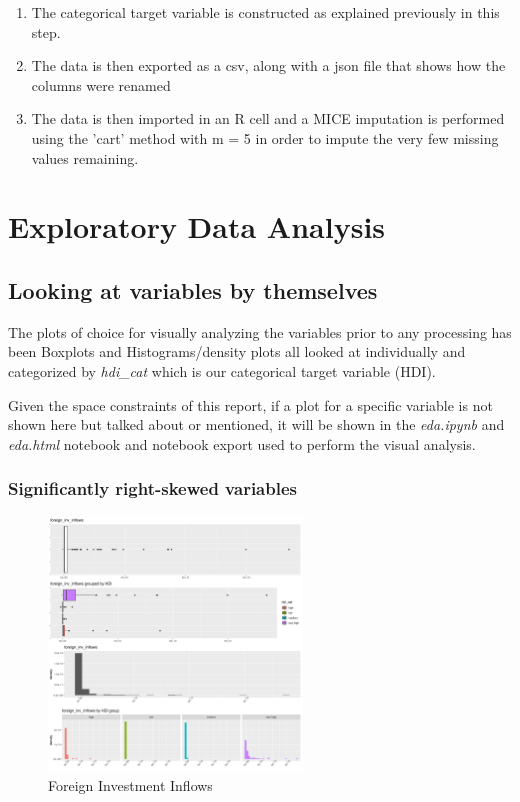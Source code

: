 \documentclass[]{article}
\begin{document}
\begin{enumerate}
  \item The categorical target variable is constructed as explained previously in this step.

  \item The data is then exported as a csv, along with a json file that shows how the columns were renamed

  \item The data is then imported in an R cell and a MICE imputation is performed using the 'cart' method with m = 5 in order to impute the very few missing values remaining.
\end{enumerate}

\newpage

\hypertarget{exploratory-data-analysis}{%
\section{Exploratory Data Analysis}\label{exploratory-data-analysis}}

\hypertarget{looking-at-variables-by-themselves}{%
\subsection{Looking at variables by
themselves}\label{looking-at-variables-by-themselves}}

The plots of choice for visually analyzing the variables prior to any
processing has been Boxplots and Histograms/density plots all looked at
individually and categorized by \emph{hdi\_cat} which is our categorical
target variable (HDI).

Given the space constraints of this report, if a plot for a specific
variable is not shown here but talked about or mentioned, it will be
shown in the \emph{eda.ipynb} and \emph{eda.html} notebook and notebook
export used to perform the visual analysis.

\hypertarget{significantly-right-skewed-variables}{%
\subsubsection{Significantly right-skewed
variables}\label{significantly-right-skewed-variables}}

\begin{figure}
\centering
\includegraphics[width=0.6\textwidth,height=\textheight]{./img/foreign_inv_inflows.png}
\caption{Foreign Investment Inflows}
\end{figure}
\end{document}

